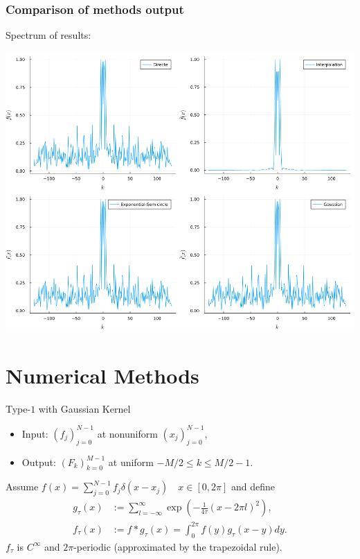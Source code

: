 \documentclass{beamer}
\begin{document}
\begin{frame}
  \frametitle{Comparison of methods output}
  Spectrum of results:

  \vfill

  \centering \includegraphics[width=.8\textwidth]{images/spectrum.png}

\end{frame}

\section{Numerical Methods}
\begin{frame}
    \sectionpage
\end{frame}

\begin{frame}{Type-$1$ with Gaussian Kernel}
  \begin{itemize}
    \item Input: $(f_{j})_{j=0}^{N-1}$ at nonuniform $(x_{j})_{j=0}^{N-1}$,
    \item Output: $(F_{k})_{k=0}^{M-1}$ at uniform $-M/2 \le k \le M/2-1$.
  \end{itemize}
  Assume $f(x) = \sum_{j=0}^{N-1}f_{j}\delta(x - x_{j}) \quad x \in [0,2\pi]$ and define
  \begin{align}
    g_{\tau}(x) &:= \sum_{l=-\infty}^{\infty}\exp\left(-\frac{1}{4\tau}(x-2\pi l)^2\right), \\
    f_{\tau}(x) &:= f\ast g_{\tau} (x) 
      = \int_{0}^{2\pi} f(y)g_{\tau}(x-y) dy.
  \end{align}
  $f_{\tau}$ is $C^{\infty}$ and $2\pi$-periodic (approximated by the trapezoidal rule).
\end{frame}
\end{document}
